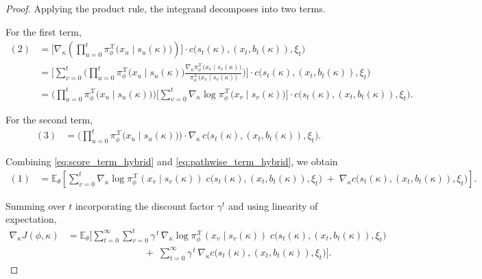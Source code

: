 \documentclass{article}
\theoremstyle{definition}
\theoremstyle{remark}
\begin{document}
\begin{proof}
Applying the product rule, the integrand decomposes into two terms.

For the first term,
\begin{align}
(2)
&=
\Bigg[
\nabla_{\kappa}
\!\left(
\prod_{u=0}^{t} \pi^{\mathcal{X}}_{\phi}\bigl(x_u \mid s_u(\kappa)\bigr)
\right)
\Bigg]
\cdot c\big(s_t(\kappa), (x_t, b_t(\kappa)), \xi_t\big)
\nonumber\\[4pt]
&=
\Bigg[
\sum_{v=0}^{t}
\Bigg(
\prod_{u=0}^{t} \pi^{\mathcal{X}}_{\phi}\bigl(x_u \mid s_u(\kappa)\bigr)
\frac{\nabla_{\kappa} \pi^{\mathcal{X}}_{\phi}\bigl(x_v \mid s_v(\kappa)\bigr)}{\pi^{\mathcal{X}}_{\phi}\bigl(x_v \mid s_v(\kappa)\bigr)}
\Bigg)
\Bigg]
\cdot c\big(s_t(\kappa), (x_t, b_t(\kappa)), \xi_t\big)
\nonumber\\[4pt]
&=
\Bigg(\prod_{u=0}^{t} \pi^{\mathcal{X}}_{\phi}\bigl(x_u \mid s_u(\kappa)\bigr)\Bigg)
\Bigg[
\sum_{v=0}^{t}
\nabla_{\kappa}\log \pi^{\mathcal{X}}_{\phi}\bigl(x_v \mid s_v(\kappa)\bigr)
\Bigg]
\cdot c\big(s_t(\kappa), (x_t, b_t(\kappa)), \xi_t\big).
\label{eq:score_term_hybrid}
\end{align}

For the second term,
\begin{align}
(3)
&=
\Bigg(\prod_{u=0}^{t} \pi^{\mathcal{X}}_{\phi}\bigl(x_u \mid s_u(\kappa)\bigr)\Bigg)
\cdot \nabla_{\kappa}\,c\big(s_t(\kappa), (x_t, b_t(\kappa)), \xi_t\big).
\label{eq:pathwise_term_hybrid}
\end{align}

Combining \eqref{eq:score_term_hybrid} and \eqref{eq:pathwise_term_hybrid}, we obtain
\begin{align*}
(1)
&=
\mathbb{E}_{\theta}\!\left[
\sum_{v=0}^{t}
\nabla_{\kappa}\log \pi^{\mathcal{X}}_{\phi}\!\left(x_v \mid s_v(\kappa)\right)\;
c\big(s_t(\kappa), (x_t, b_t(\kappa)), \xi_t\big)
\;+\;
\nabla_{\kappa} c\big(s_t(\kappa), (x_t, b_t(\kappa)), \xi_t\big)
\right].
\end{align*}

Summing over $t$ incorporating the discount factor $\gamma^t$ and using linearity of expectation,
\begin{align*}
\nabla_\kappa J(\phi,\kappa)
&=
\mathbb{E}_{\theta}\!\Bigg[
\sum_{t=0}^{\infty}\sum_{v=0}^{t}
\gamma^{\,t}\,
\nabla_{\kappa}\log \pi^{\mathcal{X}}_{\phi}\!\left(x_v \mid s_v(\kappa)\right)\;
c\big(s_t(\kappa), (x_t, b_t(\kappa)), \xi_t\big)
\\
&\qquad\qquad\qquad\qquad
+\;
\sum_{t=0}^{\infty}\gamma^{\,t}\,
\nabla_{\kappa} c\big(s_t(\kappa), (x_t, b_t(\kappa)), \xi_t\big)
\Bigg].
\end{align*}


\end{proof}
\end{document}
